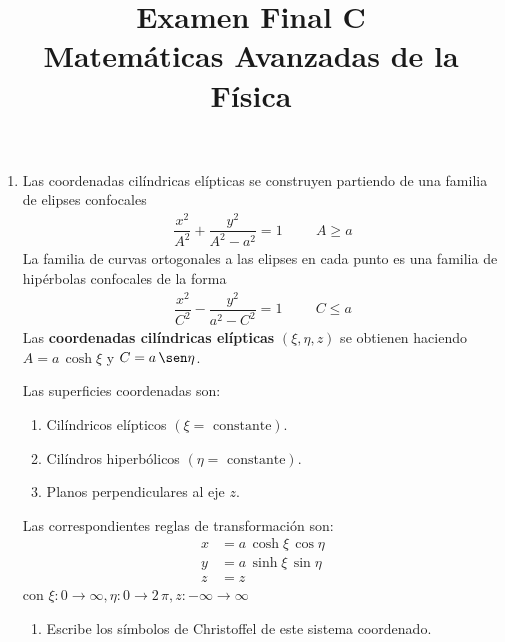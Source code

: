
\author{}
\title{Examen Final C  \\ \large{Matemáticas Avanzadas de la Física}} \vspace{-1.5\baselineskip}
\date{ }

\vspace{-4cm}
\renewcommand\labelenumii{\theenumi.{\arabic{enumii})}}
\maketitle
\fontsize{14}{14}\selectfont
\begin{enumerate}
    \item Las coordenadas cilíndricas elípticas se construyen partiendo de una familia de elipses confocales
    \begin{align*}
    \dfrac{x^{2}}{A^{2}} +  \dfrac{y^{2}}{A^{2} - a^{2}} =  1 \hspace{1cm} A \geq a
    \end{align*}
    La familia de curvas ortogonales a las elipses en cada punto es una familia de hipérbolas confocales de la forma
    \begin{align*}
    \dfrac{x^{2}}{C^{2}} - \dfrac{y^{2}}{a^{2} - C^{2}} = 1 \hspace{1cm} C \leq a
    \end{align*}
    Las \textbf{coordenadas cilíndricas elípticas} $(\xi, \eta, z)$ se obtienen haciendo $A = a \, \cosh \xi$ y $C = a \, \sen \eta$.
    \par
    Las superficies coordenadas son:
    \begin{enumerate}[label=\alph*)]
    \item Cilíndricos elípticos $(\xi = \mbox{ constante})$.
    \item Cilíndros hiperbólicos $(\eta = \mbox{ constante})$.
    \item Planos perpendiculares al eje $z$.
    \end{enumerate}
    Las correspondientes reglas de transformación son:
    \begin{align*}
    x &= a \, \cosh \xi \, \cos \eta \\
    y &= a \, \sinh \xi \, \sin \eta \\
    z &= z
    \end{align*}
    con $\xi: 0 \to \infty, \eta: 0 \to 2 \, \pi, z: -\infty \to \infty$
    \begin{enumerate}
    \item Escribe los símbolos de Christoffel de este sistema coordenado.

\end{enumerate}
\end{enumerate}

